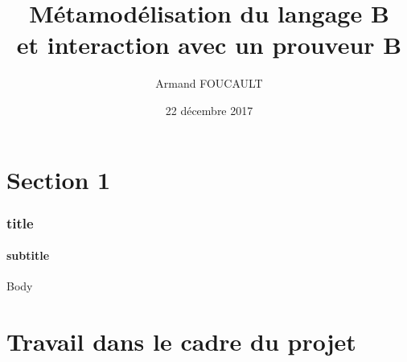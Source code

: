 \documentclass[aspectratio=169]{beamer}
\title[Métamodélisation du langage B]{Métamodélisation du langage B\\ et interaction avec un prouveur B}
\author{Armand FOUCAULT}
\date{22 décembre 2017}
\begin{document}
\begin{frame}
    \titlepage
\end{frame}

\begin{frame}
    \tableofcontents
\end{frame}

\section[]{Section 1}

\begin{frame}
    \frametitle{title}
    \framesubtitle{subtitle}
    Body
\end{frame}

\section[]{Travail dans le cadre du projet}
\end{document}
